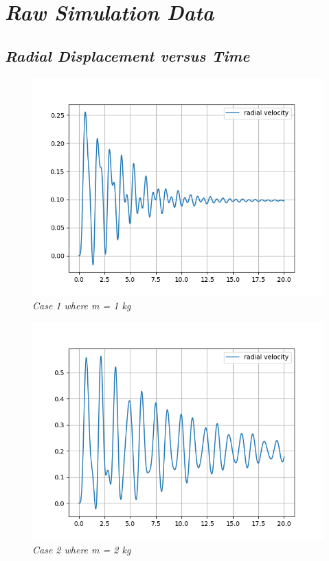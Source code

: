 \chapter{\textit{Raw Simulation Data}}\label{rawsim}
        
    \section{\textit{Radial Displacement versus Time}}
            
        \begin{figure}[H]
            \centering
            \includegraphics{Appendix/RSimPictures/R/rm1.png}
            \caption{\textit{Case 1 where m = 1 kg}}
            \label{}
        \end{figure}
            
        \begin{figure}[H]
            \centering
            \includegraphics{Appendix/RSimPictures/R/rm2.png}
            \caption{\textit{Case 2 where m = 2 kg}}
            \label{}
        \end{figure}
            
